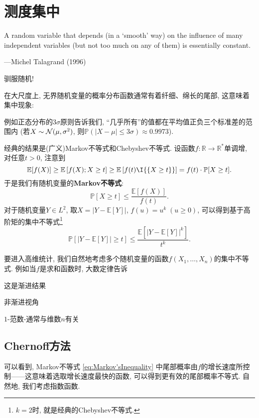 \section{测度集中}

\epigraph{A random variable that depends (in a ‘smooth’ way) on the influence of many independent variables (but not too much on any of them) is essentially constant.}{---Michel Talagrand (1996)}

驯服随机! 

在大尺度上, 无界随机变量的概率分布函数通常有着纤细、绵长的尾部, 这意味着集中现象: 

例如正态分布的$3 \sigma$原则告诉我们, “几乎所有”的值都在平均值正负三个标准差的范围内 (若$X \sim \mathcal{N}(\mu, \sigma^2)$, 则$\mathbb{P}(|X - \mu| \leq 3 \sigma) \approx 0.9973$). 

经典的结果是(广义)Markov不等式和Chebyshev不等式.
设函数$f \colon \mathbb{R} \to \mathbb{R}^*$单调增, 对任意$t > 0$, 注意到
\begin{equation*}
	\mathbb{E}[f(X)] 
		\geq \mathbb{E}\left[f(X); X \geq t \right]
		\geq \mathbb{E}\left[f(t) \I{\{X \geq t\}} \right] 
		= f(t) \cdot \mathbb{P}[X \geq t].
\end{equation*}
于是我们有随机变量的\textbf{Markov不等式}: 
\begin{equation}\label{eq:Markov'sInequality}
	\mathbb{P}[X \geq t] \leq \frac{\mathbb{E}[f(X)]}{f(t)}.
\end{equation}
对于随机变量$Y \in L^2$, 取$X = |Y - \mathbb{E}[Y]|$, $f(u) = u^k\; (u \geq 0)$, 可以得到基于高阶矩的集中不等式\footnote{$k=2$时, 就是经典的Chebyshev不等式. }
\begin{equation*}
	\mathbb{P}[|Y - \mathbb{E}[Y]| \geq t] \leq \frac{ \mathbb{E}[ |Y - \mathbb{E}[Y]|^k]}{t^k}. 
\end{equation*} 


要进入高维统计, 我们自然地考虑多个随机变量的函数$f(X_1, \dots, X_n)$的集中不等式. 
例如当$f$是求和函数时, 大数定律告诉

这是渐进结果

非渐进视角

$1$-范数-通常与维数$n$有关




\subsection{Chernoff方法}

可以看到, Markov不等式 \eqref{eq:Markov'sInequality} 中尾部概率由$f$的增长速度所控制——这意味着选取增长速度最快的函数, 可以得到更有效的尾部概率不等式. 
自然地, 我们考虑指数函数. 

